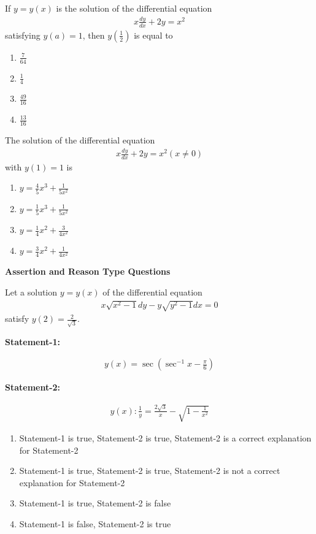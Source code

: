 \item If $y = y(x)$ is the solution of the differential equation 
\begin{align*}
x\frac{dy}{dx} + 2y = x^2
\end{align*}
satisfying $y(a) = 1$, then $y\left(\frac{1}{2}\right)$ is equal to
\begin{enumerate}
\item $\frac{7}{64}$
\item $\frac{1}{4}$
\item $\frac{49}{16}$
\item $\frac{13}{16}$
\end{enumerate}

\item The solution of the differential equation 
\begin{align*}
x\frac{dy}{dx} + 2y = x^2 (x \neq 0)
\end{align*}
with $y(1) = 1$ is
\begin{enumerate}
\item $y = \frac{4}{5}x^3 + \frac{1}{5x^2}$
\item $y = \frac{1}{5}x^3 + \frac{1}{5x^2}$
\item $y = \frac{1}{4}x^2 + \frac{3}{4x^2}$
\item $y = \frac{3}{4}x^2 + \frac{1}{4x^2}$
\end{enumerate}

\textbf{Assertion and Reason Type Questions}

\item Let a solution $y = y(x)$ of the differential equation
\begin{align*}
x\sqrt{x^2 - 1}dy - y\sqrt{y^2 - 1}dx = 0
\end{align*}
satisfy $y(2) = \frac{2}{\sqrt{3}}$.

\textbf{Statement-1:}

\begin{align*}
y(x) = \sec\left(\sec^{-1}x - \frac{\pi}{6}\right)
\end{align*}

\textbf{Statement-2:} 

\begin{align*}
y(x): \frac{1}{y} = \frac{2\sqrt{3}}{x} - \sqrt{1 - \frac{1}{x^2}}
\end{align*}
\begin{enumerate}
\item Statement-1 is true, Statement-2 is true, Statement-2 is a correct explanation for Statement-2
\item Statement-1 is true, Statement-2 is true, Statement-2 is not a correct explanation for Statement-2
\item Statement-1 is true, Statement-2 is false
\item Statement-1 is false, Statement-2 is true
\end{enumerate}

